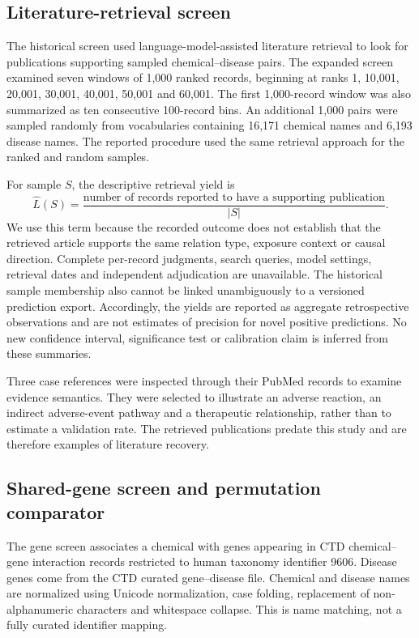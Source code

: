 \subsection{Literature-retrieval screen}
The historical screen used language-model-assisted literature retrieval to look for publications supporting sampled chemical--disease pairs. The expanded screen examined seven windows of 1,000 ranked records, beginning at ranks 1, 10,001, 20,001, 30,001, 40,001, 50,001 and 60,001. The first 1,000-record window was also summarized as ten consecutive 100-record bins. An additional 1,000 pairs were sampled randomly from vocabularies containing 16,171 chemical names and 6,193 disease names. The reported procedure used the same retrieval approach for the ranked and random samples.

For sample $S$, the descriptive retrieval yield is
\begin{equation}
 \widehat L(S)=\frac{\text{number of records reported to have a supporting publication}}{|S|}.
\end{equation}
We use this term because the recorded outcome does not establish that the retrieved article supports the same relation type, exposure context or causal direction. Complete per-record judgments, search queries, model settings, retrieval dates and independent adjudication are unavailable. The historical sample membership also cannot be linked unambiguously to a versioned prediction export. Accordingly, the yields are reported as aggregate retrospective observations and are not estimates of precision for novel positive predictions. No new confidence interval, significance test or calibration claim is inferred from these summaries.

Three case references were inspected through their PubMed records to examine evidence semantics. They were selected to illustrate an adverse reaction, an indirect adverse-event pathway and a therapeutic relationship, rather than to estimate a validation rate. The retrieved publications predate this study and are therefore examples of literature recovery.

\subsection{Shared-gene screen and permutation comparator}
The gene screen associates a chemical with genes appearing in CTD chemical--gene interaction records restricted to human taxonomy identifier 9606. Disease genes come from the CTD curated gene--disease file. Chemical and disease names are normalized using Unicode normalization, case folding, replacement of non-alphanumeric characters and whitespace collapse. This is name matching, not a fully curated identifier mapping.

